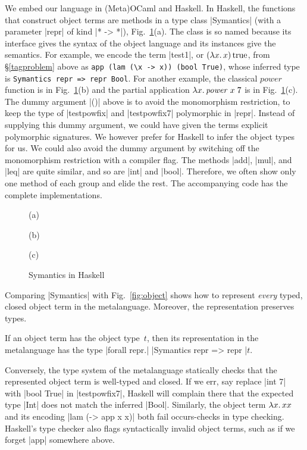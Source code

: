 We embed our language in (Meta)OCaml and Haskell.  In Haskell,
the functions that construct object terms are methods in a type class
|Symantics| (with a parameter |repr| of kind |* -> *|)\ifshort,
Fig.~\ref{fig:symantics-haskell}(a)\fi. The class is so named
because its interface gives the syntax of the object language and its
instances give the semantics.
\ifshort\else{}\fi
For example, we encode the term |test1|, or $(\mathopen{\lambda\mathord{x}.\,}x)\mathinner{\mathrm{true}}$, from
\S\ref{tagproblem} above as \texttt{app (lam (\textbackslash x -> x)) (bool True)},
whose inferred type is \texttt{Symantics repr => repr Bool}.
For another example, the classical $\mathit{power}$ function is
\ifshort in Fig.~\ref{fig:symantics-haskell}(b)
\else{}\fi
and the partial application $\mathopen{\lambda\mathord{x}.\,} \mathit{power}\;x\;7$ is
\ifshort in Fig.~\ref{fig:symantics-haskell}(c).
\else{}\fi
The dummy argument |()| above is to avoid the monomorphism
restriction, to keep the type of |testpowfix| and |testpowfix7|
polymorphic in |repr|. \ifshort\else Instead of supplying this dummy
argument, we could have given the terms explicit polymorphic
signatures.  We however prefer for
Haskell to infer the object types for us. We could also
avoid the dummy argument by switching off the monomorphism restriction
with a compiler flag. \fi
The methods |add|, |mul|, and |leq| are quite similar, and so are
|int| and |bool|. Therefore, we often show
only one method of each group and elide the rest. The
accompanying code has the complete implementations.

\ifshort
\begin{figure}
(a) 

\smallskip
(b) 

\smallskip
(c) 

\medskip
\caption{Symantics in Haskell}
\label{fig:symantics-haskell}
\end{figure}
\fi

Comparing |Symantics| with Fig.~\ref{fig:object}
shows how to represent \emph{every} typed, closed object term in the
metalanguage. Moreover, the representation preserves types.
\begin{proposition}
If an object term has the object type~$t$, then its
representation in the metalanguage has the type 
|forall repr.| |Symantics repr => repr |$t$.
\end{proposition}
Conversely, the type system of the metalanguage statically checks that the
represented object term is well-typed and closed.
If we err, say replace |int 7| with |bool True| in
|testpowfix7|, Haskell will complain there that the expected type |Int| does not
match the inferred |Bool|.  Similarly, the object term $\mathopen{\lambda\mathord{x}.\,}xx$ and its
encoding |lam (\x -> app x x)| both fail occurs-checks in type checking.
Haskell's type checker also flags syntactically invalid object terms, 
such as if we forget |app| somewhere above.

